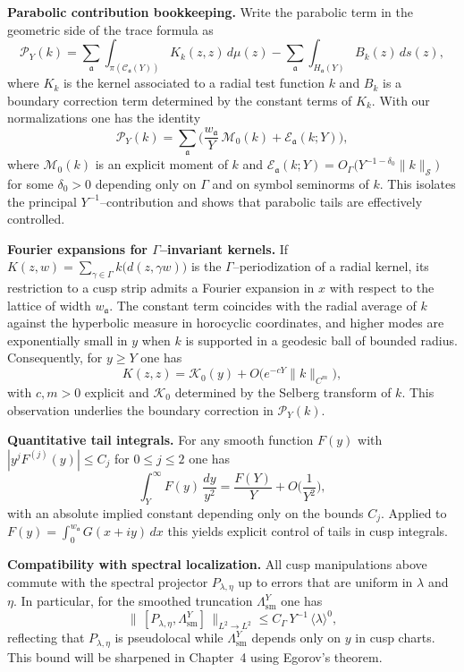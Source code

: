 \medskip
\noindent\textbf{Parabolic contribution bookkeeping.}
Write the parabolic term in the geometric side of the trace formula as
\[
  \mathcal{P}_{Y}(k)
  =
  \sum_{\mathfrak{a}} \int_{\pi(\mathcal{C}_{\mathfrak{a}}(Y))} K_{k}(z,z)\,d\mu(z)
  - \sum_{\mathfrak{a}} \int_{H_{\mathfrak{a}}(Y)} B_{k}(z)\, ds(z),
\]
where $K_{k}$ is the kernel associated to a radial test function $k$ and $B_{k}$ is a boundary correction term determined by the constant terms of $K_{k}$.
With our normalizations one has the identity
\[
  \mathcal{P}_{Y}(k)
  =
  \sum_{\mathfrak{a}}
  \Big( \frac{w_{\mathfrak{a}}}{Y}\, \mathcal{M}_{0}(k) + \mathcal{E}_{\mathfrak{a}}(k;Y) \Big),
\]
where $\mathcal{M}_{0}(k)$ is an explicit moment of $k$ and
$\mathcal{E}_{\mathfrak{a}}(k;Y)=O_{\Gamma}\big( Y^{-1-\delta_{0}}\|k\|_{\mathscr{S}} \big)$
for some $\delta_{0}>0$ depending only on $\Gamma$ and on symbol seminorms of $k$.
This isolates the principal $Y^{-1}$–contribution and shows that parabolic tails are effectively controlled.

\medskip
\noindent\textbf{Fourier expansions for $\Gamma$–invariant kernels.}
If $K(z,w)=\sum_{\gamma\in\Gamma}k\!\big(d(z,\gamma w)\big)$ is the $\Gamma$–periodization of a radial kernel,
its restriction to a cusp strip admits a Fourier expansion in $x$ with respect to the lattice of width $w_{\mathfrak{a}}$.
The constant term coincides with the radial average of $k$ against the hyperbolic measure in horocyclic coordinates,
and higher modes are exponentially small in $y$ when $k$ is supported in a geodesic ball of bounded radius.
Consequently, for $y\ge Y$ one has
\[
  K(z,z)
  =
  \mathcal{K}_{0}(y) + O\!\big( e^{-cY} \|k\|_{C^{m}} \big),
\]
with $c,m>0$ explicit and $\mathcal{K}_{0}$ determined by the Selberg transform of $k$.
This observation underlies the boundary correction in $\mathcal{P}_{Y}(k)$.

\medskip
\noindent\textbf{Quantitative tail integrals.}
For any smooth function $F(y)$ with $|y^{j}F^{(j)}(y)|\le C_{j}$ for $0\le j\le 2$ one has
\[
  \int_{Y}^{\infty} F(y)\,\frac{dy}{y^{2}}
  =
  \frac{F(Y)}{Y}
  + O\!\Big( \frac{1}{Y^{2}} \Big),
\]
with an absolute implied constant depending only on the bounds $C_{j}$.
Applied to $F(y)=\int_{0}^{w_{\mathfrak{a}}} G(x+iy)\,dx$ this yields explicit control of tails in cusp integrals.

\medskip
\noindent\textbf{Compatibility with spectral localization.}
All cusp manipulations above commute with the spectral projector $P_{\lambda,\eta}$
up to errors that are uniform in $\lambda$ and $\eta$.
In particular, for the smoothed truncation $\Lambda_{\mathrm{sm}}^{Y}$ one has
\[
  \| \,[P_{\lambda,\eta}, \Lambda_{\mathrm{sm}}^{Y}]\, \|_{L^{2}\to L^{2}}
  \le
  C_{\Gamma}\, Y^{-1}\, \langle \lambda \rangle^{0},
\]
reflecting that $P_{\lambda,\eta}$ is pseudolocal while $\Lambda_{\mathrm{sm}}^{Y}$ depends only on $y$ in cusp charts.
This bound will be sharpened in Chapter~4 using Egorov’s theorem.

